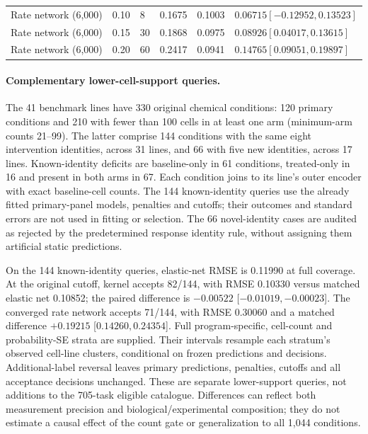 \documentclass[a4paper,fleqn]{cas-sc}
\makeatletter
\DeclareRobustCommand{\rev}[1]{{\color{red}\def\@citecolor{black}\def\@linkcolor{red}\def\@urlcolor{red}#1}}
\makeatother
\begin{document}
\begin{longtable}{p{}p{}p{}p{}p{}p{}}
\rev{Rate network (6,000)} & \rev{0.10} & \rev{8} & \rev{0.1675} & \rev{0.1003} & \rev{$0.06715$\newline$[-0.12952,0.13523]$}\\
\rev{Rate network (6,000)} & \rev{0.15} & \rev{30} & \rev{0.1868} & \rev{0.0975} & \rev{$0.08926$\newline$[0.04017,0.13615]$}\\
\rev{Rate network (6,000)} & \rev{0.20} & \rev{60} & \rev{0.2417} & \rev{0.0941} & \rev{$0.14765$\newline$[0.09051,0.19897]$}\\
\bottomrule
\end{longtable}
\normalsize

\paragraph{Complementary lower-cell-support queries.}
The 41 benchmark lines have 330 original chemical conditions: 120 primary conditions and 210 with fewer than 100 cells in at least one arm (minimum-arm counts 21--99). The latter comprise 144 conditions with the same eight intervention identities, across 31 lines, and 66 with five new identities, across 17 lines. Known-identity deficits are baseline-only in 61 conditions, treated-only in 16 and present in both arms in 67. Each condition joins to its line's outer encoder with exact baseline-cell counts. The 144 known-identity queries use the already fitted primary-panel models, penalties and cutoffs; their outcomes and standard errors are not used in fitting or selection. The 66 novel-identity cases are audited as rejected by the predetermined response identity rule, without assigning them artificial static predictions.

On the 144 known-identity queries, elastic-net RMSE is 0.11990 at full coverage. At the original cutoff, kernel accepts 82/144, with RMSE 0.10330 versus matched elastic net 0.10852; the paired difference is $-0.00522$ [$-0.01019,-0.00023$]. The converged rate network accepts 71/144, with RMSE 0.30060 and a matched difference $+0.19215$ [$0.14260,0.24354$]. Full program-specific, cell-count and probability-SE strata are supplied. Their intervals resample each stratum's observed cell-line clusters, conditional on frozen predictions and decisions. Additional-label reversal leaves primary predictions, penalties, cutoffs and all acceptance decisions unchanged. \rev{These are separate lower-support queries, not additions to the 705-task eligible catalogue.} Differences can reflect both measurement precision and biological/experimental composition; they do not estimate a causal effect of the count gate or generalization to all 1,044 conditions.
\end{document}
